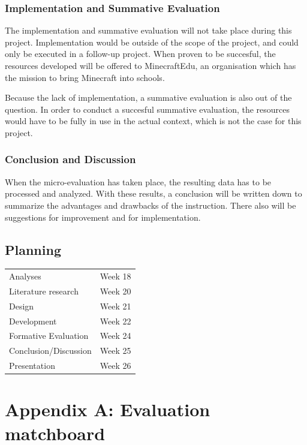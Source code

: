 \documentclass[12pt]{report} %
\begin{document}
\section{Implementation and Summative Evaluation}

The implementation and summative evaluation will not take place during this project. Implementation would be outside of the scope of the project, and could only be executed in a follow-up project. When proven to be succesful, the resources developed will be offered to MinecraftEdu, an organisation which has the mission to bring Minecraft into schools.

Because the lack of implementation, a summative evaluation is also out of the question. In order to conduct a succesful summative evaluation, the resources would have to be fully in use in the actual context, which is not the case for this project.

\section{Conclusion and Discussion}

When the micro-evaluation has taken place, the resulting data has to be processed and analyzed. With these results, a conclusion will be written down to summarize the advantages and drawbacks of the instruction. There also will be suggestions for improvement and for implementation.

\chapter{Planning}

\begin{center}
\begin{tabular}{ l r }
Analyses & Week 18 \\
Literature research & Week 20 \\
Design & Week 21 \\
Development & Week 22 \\
Formative Evaluation & Week 24 \\
Conclusion/Discussion & Week 25 \\
Presentation & Week 26 \\
\end{tabular}
\end{center}




\part{Appendix A: Evaluation matchboard}


\end{document}
